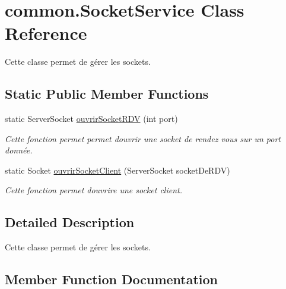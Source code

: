\hypertarget{classcommon_1_1SocketService}{}\section{common.\+Socket\+Service Class Reference}
\label{classcommon_1_1SocketService}


Cette classe permet de gérer les sockets.  


\subsection*{Static Public Member Functions}
\begin{DoxyCompactItemize}
\item 
static Server\+Socket \hyperlink{classcommon_1_1SocketService_a015867bbf56a89c3cd7a43a780f4147c}{ouvrir\+Socket\+R\+DV} (int port)
\begin{DoxyCompactList}\small\item\em Cette fonction permet permet d\textquotesingle{}ouvrir une socket de rendez vous sur un port donnée. \end{DoxyCompactList}\item 
static Socket \hyperlink{classcommon_1_1SocketService_a2954ada119e92937ee0750a694f15330}{ouvrir\+Socket\+Client} (Server\+Socket socket\+De\+R\+DV)
\begin{DoxyCompactList}\small\item\em Cette fonction permet d\textquotesingle{}ouvrire une socket client. \end{DoxyCompactList}\end{DoxyCompactItemize}


\subsection{Detailed Description}
Cette classe permet de gérer les sockets. 

\subsection{Member Function Documentation}
\mbox{\label{classcommon_1_1SocketService_a2954ada119e92937ee0750a694f15330}} 
